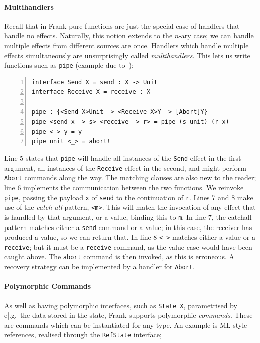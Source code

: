 \documentclass[msc,deptreport,cs]{infthesis} %
\newcommand{\code}[1]{\lstinline{#1}}
\begin{document}
\paragraph*{Multihandlers}

Recall that in Frank pure functions are just the special case of handlers that
handle no effects. Naturally, this notion extends to the $n$-ary case; we can
handle multiple effects from different sources are once. Handlers which handle
multiple effects simultaneously are unsurprisingly called \emph{multihandlers}.
This lets us write functions such as \code{pipe} (example due to~\cite{convent2020doo});

\begin{lstlisting}[numbers=left]
interface Send X = send : X -> Unit
interface Receive X = receive : X
 
pipe : {<Send X>Unit -> <Receive X>Y -> [Abort]Y}
pipe <send x -> s> <receive -> r> = pipe (s unit) (r x)
pipe <_> y = y
pipe unit <_> = abort!
\end{lstlisting}

Line 5 states that \code{pipe} will handle all instances of the \code{Send}
effect in the first argument, all instances of the \code{Receive} effect in the
second, and might perform \code{Abort} commands along the way. The matching
clauses are also new to the reader; line 6 implements the communication between
the two functions. We reinvoke \code{pipe}, passing the payload \code{x} of
\code{send} to the continuation of \code{r}. Lines 7 and 8 make use of the
\emph{catch-all} pattern, \code{<m>}. This will match the invocation of any
effect that is handled by that argument, or a value, binding this to \code{m}.
In line 7, the catchall pattern matches either a \code{send} command or a value;
in this case, the receiver has produced a value, so we can return that. In line
8 \code{<_>} matches either a value or a \code{receive}; but it must be a
\code{receive} command, as the value case would have been caught above. The
\code{abort} command is then invoked, as this is erroneous. A recovery strategy
can be implemented by a handler for \code{Abort}.

\paragraph*{Polymorphic Commands}

As well as having polymorphic interfaces, such as \code{State X}, parametrised
by e|.g.~the data stored in the state, Frank supports polymorphic
\emph{commands}. These are commands which can be instantiated for any type. An
example is ML-style references, realised through the \code{RefState} interface;
\end{document}
